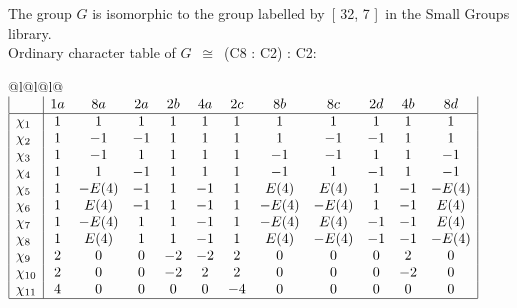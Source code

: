 \documentclass[varwidth=\maxdimen,border=10]{standalone}
\begin{document}
The group $G$ is isomorphic to the group labelled by\ [ 32, 7 ]\ in the Small Groups library.\\
Ordinary character table of $G$\ $\cong$\ (C8 : C2) : C2:\\
\begin{center}
\begin{tabular}{@{}l@{}l@{}l@{}}
\hline
\(\begin{array}{|l|ccccccccccc|}
  & 1a & 8a & 2a & 2b & 4a & 2c & 8b & 8c & 2d & 4b & 8d\\ \hline
\chi_{1} & 1 & 1 & 1 & 1 & 1 & 1 & 1 & 1 & 1 & 1 & 1\\
\chi_{2} & 1 & -1 & -1 & 1 & 1 & 1 & 1 & -1 & -1 & 1 & 1\\
\chi_{3} & 1 & -1 & 1 & 1 & 1 & 1 & -1 & -1 & 1 & 1 & -1\\
\chi_{4} & 1 & 1 & -1 & 1 & 1 & 1 & -1 & 1 & -1 & 1 & -1\\
\chi_{5} & 1 & -E(4) & -1 & 1 & -1 & 1 & E(4) & E(4) & 1 & -1 & -E(4)\\
\chi_{6} & 1 & E(4) & -1 & 1 & -1 & 1 & -E(4) & -E(4) & 1 & -1 & E(4)\\
\chi_{7} & 1 & -E(4) & 1 & 1 & -1 & 1 & -E(4) & E(4) & -1 & -1 & E(4)\\
\chi_{8} & 1 & E(4) & 1 & 1 & -1 & 1 & E(4) & -E(4) & -1 & -1 & -E(4)\\
\chi_{9} & 2 & 0 & 0 & -2 & -2 & 2 & 0 & 0 & 0 & 2 & 0\\
\chi_{10} & 2 & 0 & 0 & -2 & 2 & 2 & 0 & 0 & 0 & -2 & 0\\
\chi_{11} & 4 & 0 & 0 & 0 & 0 & -4 & 0 & 0 & 0 & 0 & 0\\
\hline
\end{array}\)\\
\end{tabular}
\end{center}
\end{document}
